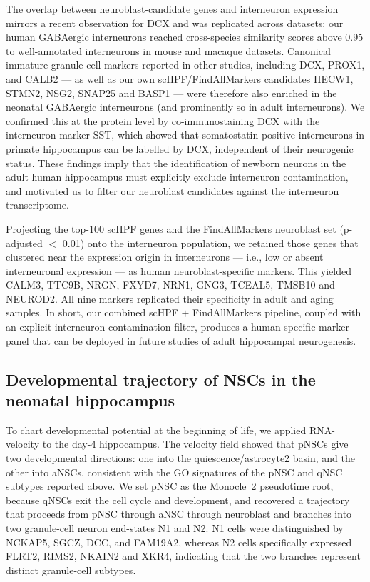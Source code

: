 \documentclass[11pt]{article}
\begin{document}
The overlap between neuroblast-candidate genes and interneuron expression
mirrors a recent observation for DCX \cite{franjic2022transcriptomic} and
was replicated across datasets: our human GABAergic interneurons reached
cross-species similarity scores above 0.95 to well-annotated interneurons
in mouse and macaque datasets. Canonical immature-granule-cell markers
reported in other studies, including DCX, PROX1, and CALB2 --- as well as
our own scHPF/FindAllMarkers candidates HECW1, STMN2, NSG2, SNAP25 and
BASP1 --- were therefore also enriched in the neonatal GABAergic
interneurons (and prominently so in adult interneurons). We confirmed this
at the protein level by co-immunostaining DCX with the interneuron marker
SST, which showed that somatostatin-positive interneurons in primate
hippocampus can be labelled by DCX, independent of their neurogenic
status. These findings imply that the identification of newborn neurons
in the adult human hippocampus must explicitly exclude interneuron
contamination, and motivated us to filter our neuroblast candidates
against the interneuron transcriptome.

Projecting the top-100 scHPF genes and the FindAllMarkers neuroblast set
(p-adjusted $<$ 0.01) onto the interneuron population, we retained those
genes that clustered near the expression origin in interneurons --- i.e.,
low or absent interneuronal expression --- as human neuroblast-specific
markers. This yielded CALM3, TTC9B, NRGN, FXYD7, NRN1, GNG3, TCEAL5,
TMSB10 and NEUROD2. All nine markers replicated their specificity in
adult and aging samples. In short, our combined scHPF $+$ FindAllMarkers
pipeline, coupled with an explicit interneuron-contamination filter,
produces a human-specific marker panel that can be deployed in future
studies of adult hippocampal neurogenesis.

\subsection{Developmental trajectory of NSCs in the neonatal hippocampus}

To chart developmental potential at the beginning of life, we applied
RNA-velocity \cite{lamanno2018rna} to the day-4 hippocampus. The velocity
field showed that pNSCs give two developmental directions: one into the
quiescence/astrocyte2 basin, and the other into aNSCs, consistent with the
GO signatures of the pNSC and qNSC subtypes reported above. We set pNSC as
the Monocle~2 \cite{trapnell2014dynamics} pseudotime root, because qNSCs
exit the cell cycle and development, and recovered a trajectory that
proceeds from pNSC through aNSC through neuroblast and branches into two
granule-cell neuron end-states N1 and N2. N1 cells were distinguished by
NCKAP5, SGCZ, DCC, and FAM19A2, whereas N2 cells specifically expressed
FLRT2, RIMS2, NKAIN2 and XKR4, indicating that the two branches represent
distinct granule-cell subtypes.
\end{document}
